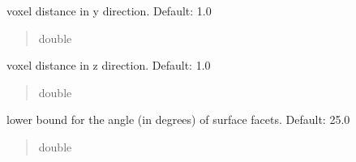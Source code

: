 \documentclass[letterpaper,10pt,english]{sphinxmanual}
\begin{document}
\begin{fulllineitems}

\begin{fulllineitems}
\label{\detokenize{_autosummary/nirfasterff.utils.MeshingParams:nirfasterff.utils.MeshingParams.yPixelSpacing}}
\pysigstartsignatures
\pysigline
{}
\pysigstopsignatures
\sphinxAtStartPar
voxel distance in y direction. Default: 1.0
\begin{quote}\begin{description}
\sphinxAtStartPar
double

\end{description}\end{quote}

\end{fulllineitems}


\begin{fulllineitems}
\label{\detokenize{_autosummary/nirfasterff.utils.MeshingParams:nirfasterff.utils.MeshingParams.SliceThickness}}
\pysigstartsignatures
\pysigline
{}
\pysigstopsignatures
\sphinxAtStartPar
voxel distance in z direction. Default: 1.0
\begin{quote}\begin{description}
\sphinxAtStartPar
double

\end{description}\end{quote}

\end{fulllineitems}


\begin{fulllineitems}
\label{\detokenize{_autosummary/nirfasterff.utils.MeshingParams:nirfasterff.utils.MeshingParams.facet_angle}}
\pysigstartsignatures
\pysigline
{}
\pysigstopsignatures
\sphinxAtStartPar
lower bound for the angle (in degrees) of surface facets. Default: 25.0
\begin{quote}\begin{description}
\sphinxAtStartPar
double


\end{description}
\end{quote}
\end{fulllineitems}
\end{fulllineitems}
\end{document}
